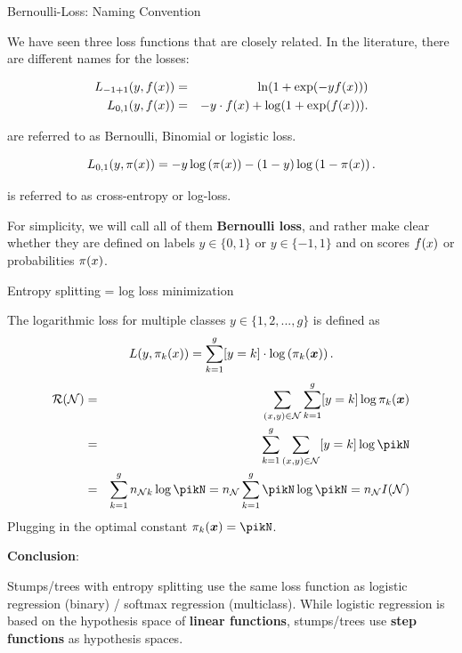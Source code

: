 \begin{vbframe}{Bernoulli-Loss: Naming Convention}

We have seen three loss functions that are closely related. In the literature, there are different names for the losses: 

\begin{eqnarray*}
  L_{-1+1}(y, f(x)) &=& \ln(1+\exp(-yf(x))) \\
  L_{0, 1}(y, f(x)) &=& - y \cdot f(x) + \log(1 + \exp(f(x))). 
\end{eqnarray*}

are referred to as Bernoulli, Binomial or logistic loss. 

  $$
    L_{0,1}(y, \pi(x)) = - y \log \left(\pi(x)\right) - (1 - y) \log \left(1 - \pi(x)\right). 
  $$

is referred to as cross-entropy or log-loss. 

\lz 

For simplicity, we will call all of them \textbf{Bernoulli loss}, and rather make clear whether they are defined on labels $y \in \{0, 1\}$ or $y \in \{-1, 1\}$ and on scores $f(x)$ or probabilities $\pi(x)$. 

\end{vbframe}



\begin{vbframe}{Entropy splitting = log loss minimization}

The logarithmic loss for multiple classes $y \in \{1, 2, ..., g\}$ is defined as
$$ L(y, \pi_k(x)) = \sum_{k = 1}^g [y = k] \cdot \log \left(\pi_k(\bm{x})\right). $$
\vspace{-0.4cm}
\begin{eqnarray*}
\risk(\Np) &=& \sum_{\xy \in \Np}  \sum_{k = 1}^g [y = k] \log \pi_k(\xv) \\
&=& \sum_{k = 1}^g \sum_{\xy \in \Np} [y = k] \log \pikN \\
&=& \sum_{k = 1}^g n_{\Np k} \log \pikN = n_{\Np} \sum_{k = 1}^g \pikN \log \pikN = n_\Np I(\Np)
\end{eqnarray*} 
Plugging in the optimal constant $\pi_k(\xv) = \pikN$.


\framebreak

\textbf{Conclusion}: 
  
  Stumps/trees with entropy splitting use the same loss function as logistic regression (binary) / softmax regression (multiclass). While logistic regression is based on the hypothesis space of \textbf{linear functions}, stumps/trees use \textbf{step functions} as hypothesis spaces. 

\end{vbframe}







